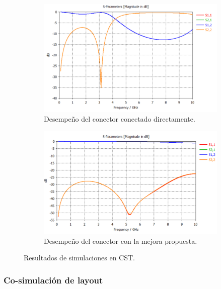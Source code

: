 \begin{figure}
    \centering

    \begin{subfigure}[b]{0.45\textwidth}
        \includegraphics[width=\textwidth]{images/sma_simulation_result.png}
        \caption{Desempeño del conector conectado directamente.}
        \label{fig:sma_simulation_result}
    \end{subfigure}
    \hfill
    \begin{subfigure}[b]{0.45\textwidth}
        \includegraphics[width=\textwidth]{images/sma_improvement_result.png}
        \caption{Desempeño del conector con la mejora propuesta.}
        \label{fig:sma_improvement_result}
    \end{subfigure}

    \caption{Resultados de simulaciones en CST.}
    \label{fig:sma_simulations_results}
\end{figure}

\subsubsection{Co-simulación de layout}

